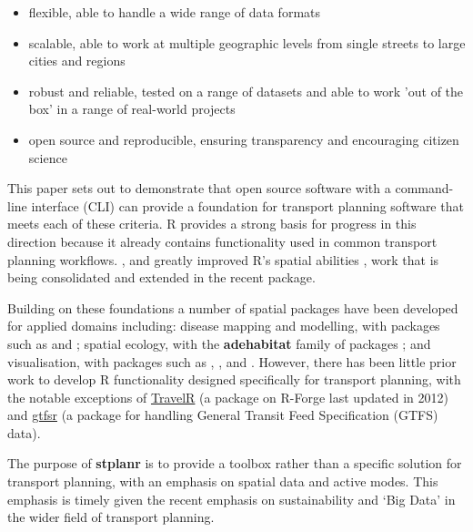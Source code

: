 \begin{itemize}
\tightlist
\item
  flexible, able to handle a wide range of data formats
\item
  scalable, able to work at multiple geographic levels from single streets to large cities and regions
\item
  robust and reliable, tested on a range of datasets and able to work 'out of the box' in a range of real-world projects
\item
  open source and reproducible, ensuring transparency and encouraging citizen science
\end{itemize}

This paper sets out to demonstrate that open source software with a command-line interface (CLI) can provide a foundation for transport planning software that meets
each of these criteria.
R provides a strong basis for progress in this direction because it already contains functionality used in common transport planning workflows.
,  and  greatly improved R's spatial abilities \citep{bivand_applied_2013}, work that is being consolidated and extended in the recent  package.

Building on these foundations a number of spatial packages have been developed for applied domains including: disease mapping and modelling, with packages such as  and  \citep{kim_spatialepi:_2016,brown_diseasemapping:_2016}; spatial ecology, with the \textbf{adehabitat} family of packages \citep{calenge_package_2006};
and visualisation, with packages such as , ,  and  \citep{RJ-2016-005}.
However, there has been little prior work to develop R functionality designed
specifically for transport planning, with the notable exceptions of
\href{http://r-forge.r-project.org/projects/travelr/}{TravelR} (a package on R-Forge last updated in 2012)
and \href{https://github.com/ropensci/gtfsr}{gtfsr}
(a package for handling  General Transit Feed Specification (GTFS) data).

The purpose of \textbf{stplanr} is to provide a toolbox rather than a specific solution for transport planning, with an emphasis on spatial data and active modes.
This emphasis is timely given the recent emphasis on sustainability \citep{banister_sustainable_2008} and `Big Data' \citep{zheng_big_2016} in the wider field of transport planning.

